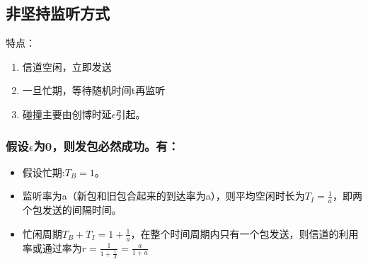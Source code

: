 \subsection{非坚持监听方式}
特点：
\begin{enumerate}
	\item 信道空闲，立即发送
	\item 一旦忙期，等待随机时间t再监听
	\item 碰撞主要由创博时延$ \epsilon $引起。
\end{enumerate}
\subsubsection{假设$ \epsilon $为0，则发包必然成功。有：}
\begin{itemize}
	\item 假设忙期:$ T_B = 1 $。
	\item 监听率为a（新包和旧包合起来的到达率为a），则平均空闲时长为$ T_I = \frac{1}{a} $，即两个包发送的间隔时间。
	\item 忙闲周期$  T_B + T_I = 1+\frac{1}{a} $，在整个时间周期内只有一个包发送，则信道的利用率或通过率为$ r=\frac{1}{1+\frac{1}{A}}  = \frac{a}{1+a}$
\end{itemize}
